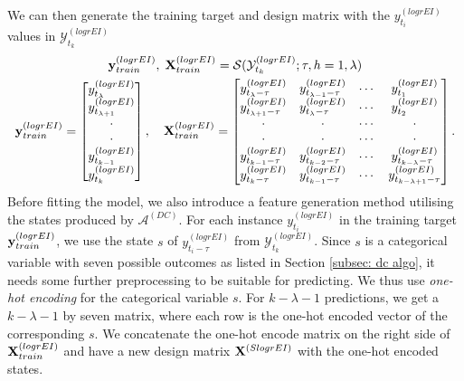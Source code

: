 We can then generate the training target and design matrix with the $y^{(logrEI)}_{t_i}$ values in $\mathcal{Y}^{(logrEI)}_{t_k}$
\begin{gather*}
    \mathbf{y}^{(logrEI)}_{train}, \; \mathbf{X}^{(logrEI)}_{train} = \mathcal{S} (\mathcal{Y}^{(logrEI)}_{t_k} ; \tau, h=1, \lambda) \\
    \mathbf{y}^{(logrEI)}_{train} = \begin{bmatrix}
        y^{(logrEI)}_{t_\lambda}       \\
        y^{(logrEI)}_{t_{\lambda + 1}} \\
        \cdot               \\
        \cdot               \\
        y^{(logrEI)}_{t_{k-1}}         \\
        y^{(logrEI)}_{t_k}             \\
    \end{bmatrix}
    , \quad
    \mathbf{X}^{(logrEI)}_{train} = \begin{bmatrix}
        y^{(logrEI)}_{t_{\lambda} - \tau}   & y^{(logrEI)}_{t_{\lambda-1} - \tau} & \cdots & y^{(logrEI)}_{t_{1}} \\
        y^{(logrEI)}_{t_{\lambda+1} - \tau} & y^{(logrEI)}_{t_{\lambda} - \tau}   & \cdots & y^{(logrEI)}_{t_{2}} \\
        \cdot                    & \cdot                    & \cdots & \cdot     \\
        \cdot                    & \cdot                    & \cdots & \cdot     \\
        y^{(logrEI)}_{t_{k-1} - \tau}       & y^{(logrEI)}_{t_{k-2} - \tau}       & \cdots & y^{(logrEI)}_{t_{k - \lambda} - \tau}     \\
        y^{(logrEI)}_{t_{k} - \tau}         & y^{(logrEI)}_{t_{k-1} - \tau}       & \cdots & y^{(logrEI)}_{t_{k - \lambda + 1} - \tau} \\
    \end{bmatrix}.
\end{gather*}
Before fitting the model, we also introduce a feature generation method utilising the states produced by $\mathcal{A}^{(DC)}$. For each instance $y^{(logrEI)}_{t_i}$ in the training target $\mathbf{y}^{(logrEI)}_{train}$, we use the state $s$ of $y^{(logrEI)}_{t_i - \tau}$ from $\mathcal{Y}^{(logrEI)}_{t_k}$. Since $s$ is a categorical variable with seven possible outcomes as listed in Section \ref{subsec: dc algo}, it needs some further preprocessing to be suitable for predicting. We thus use \textit{one-hot encoding} for the categorical variable $s$. For $k - \lambda - 1$ predictions, we get a $k - \lambda - 1$ by seven matrix, where each row is the one-hot encoded vector of the corresponding $s$. We concatenate the one-hot encode matrix on the right side of $\mathbf{X}^{(logrEI)}_{train}$ and have a new design matrix $\mathbf{X}^{(SlogrEI)}$ with the one-hot encoded states.

